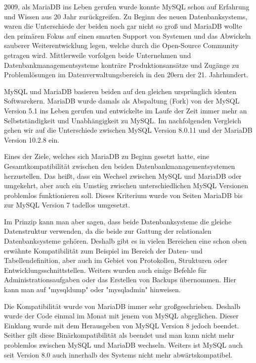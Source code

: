 
2009, als MariaDB ins Leben gerufen wurde konnte MySQL schon auf Erfahrung und Wissen aus 20 Jahr zurückgreifen. Zu Beginn des neuen Datenbanksystems, waren die Unterschiede der beiden noch gar nicht so groß und MariaDB wollte den primären Fokus auf einen smarten Support von Systemen und das Abwickeln sauberer Weiterentwicklung legen, welche durch die Open-Source Community getragen wird. Mittlerweile vorfolgen beide Unternehmen und Datenbankmanagementsysteme konträre Produktionsansätze und Zugänge zu Problemlösungen im Datenverwaltungsbereich in den 20ern der 21. Jahrhundert.

MySQL und MariaDB basieren beiden auf den gleichen ursprünglich identen Softwarekern. MariaDB wurde damals als Abspaltung (Fork) von der MySQL Version 5.1 ins Leben gerufen und entwickelte im Laufe der Zeit immer mehr an Selbstständigkeit und Unabhängigkeit zu MySQL. Im nachfolgenden Vergleich gehen wir auf die Unterschiede zwischen MySQL Version 8.0.11 und der MariaDB Version 10.2.8 ein.


Eines der Ziele, welches sich MariaDB zu Beginn gesetzt hatte, eine Gesamtkompatibilität zwischen den beiden Datenbankmanagementsystemen herzustellen. Das heißt, dass ein Wechsel zwischen MySQL und MariaDB oder umgekehrt, aber auch ein Umstieg zwischen unterschiedlichen MySQL Versionen problemlos funktionieren soll. Dieses Kriterium wurde von Seiten MariaDB bis zur MySQL Version 7 tadellos umgesetzt.

Im Prinzip kann man aber sagen, dass beide Datenbanksysteme die gleiche Datenstruktur verwenden, da die beide zur Gattung der relationalen Datenbanksysteme gehören. Deshalb gibt es in vielen Bereichen eine schon oben erwähnte Kompatibilität zum Beispiel im Bereich der Daten- und Tabellendefinition, aber auch im Gebiet von Protokollen, Strukturen oder Entwicklungsschnittstellen. Weiters wurden auch einige Befehle für Administrationsaufgaben oder das Erstellen von Backups übernommen. Hier kann man auf "mysqldump" oder "mysqladmin" hinweisen.

Die Kompatibilität wurde von MariaDB immer sehr großgeschrieben. Deshalb wurde der Code einmal im Monat mit jenem von MySQL abgeglichen. Dieser Einklang wurde mit dem Herausgeben von MySQL Version 8 jedoch beendet. Seither gilt diese Binärkompatibilität als beendet und man kann nicht mehr problemlos zwischen MySQL und MariaDB wechseln. Weiters ist MySQL auch seit Version 8.0 auch innerhalb des Systems nicht mehr abwärtskompatibel.

